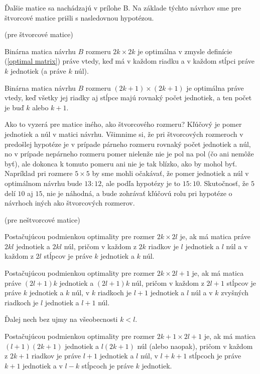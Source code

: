 Ďalšie matice sa nachádzajú v prílohe B. Na základe týchto návrhov sme pre štvorcové matice prišli s nasledovnou hypotézou.

\begin{hypoteza}
\label{hypoteza1}
(pre štvorcové matice)

Binárna matica návrhu $B$ rozmeru $2k \times 2k$ je optimálna v zmysle definície (\ref{optimal matrix}) práve vtedy, 
keď má v každom riadku a v každom stĺpci práve $k$ jednotiek (a práve $k$ núl).

Binárna matica návrhu $B$ rozmeru $(2k + 1) \times (2k + 1)$ je optimálna práve vtedy, 
keď všetky jej riadky aj stĺpce majú rovnaký počet jednotiek, a ten počet je buď $k$ alebo $k + 1$.
\end{hypoteza}

Ako to vyzerá pre matice iného, ako štvorcového rozmeru? 
Kľúčový je pomer jednotiek a núl v matici návrhu. 
Všimnime si, že pri štvorcových rozmeroch v predošlej hypotéze je v prípade párneho rozmeru rovnaký počet jednotiek a núl, 
no v prípade nepárneho rozmeru pomer nielenže nie je pol na pol (čo ani nemôže byť), 
ale dokonca k tomuto pomeru ani nie je tak blízko, ako by mohol byť. 
Napríklad pri rozmere $5 \times 5$ by sme mohli očakávať, že pomer jednotiek a núl v optimálnom návrhu bude $13:12$, 
ale podľa hypotézy je to $15:10$. Skutočnosť, že $5$ delí $10$ aj $15$, nie je náhodná, 
a bude zohrávať kľúčovú rolu pri hypotéze o návrhoch iných ako štvorcových rozmerov.

\begin{hypoteza}
\label{hypoteza2}
(pre neštvorcové matice)

Postačujúcou podmienkou optimality pre rozmer $2k \times 2l$ je, ak má matica práve $2kl$ jednotiek a $2kl$ núl, 
pričom v každom z $2k$ riadkov je $l$ jednotiek a $l$ núl a v každom z $2l$ stĺpcov je práve $k$ jednotiek a $k$ núl.

Postačujúcou podmienkou optimality pre rozmer $2k \times 2l + 1$ je, ak má matica práve $(2l + 1)k$ jednotiek a $(2l + 1)k$ núl, 
pričom v každom z $2l + 1$ stĺpcov je práve $k$ jednotiek a $k$ núl, v $k$ riadkoch je $l + 1$ jednotiek a $l$ núl 
a v $k$ zvyšných riadkoch je $l$ jednotiek a $l + 1$ núl.

Ďalej nech bez ujmy na všeobecnosti $k < l$.

Postačujúcou podmienkou optimality pre rozmer $2k + 1 \times 2l + 1$ je, 
ak má matica $(l + 1)(2k + 1)$ jednotiek a $l(2k + 1)$ núl (alebo naopak), 
pričom v každom z $2k + 1$ riadkov je práve $l + 1$ jednotiek a $l$ núl, v $l + k + 1$ stĺpcoch je práve $k + 1$
jednotiek a v $l - k$ stĺpcoch je práve $k$ jednotiek.
\end{hypoteza}


